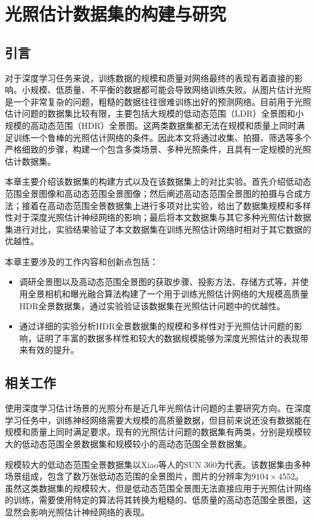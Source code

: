 \chapter{光照估计数据集的构建与研究}\label{chap:dataset}
\section{引言}
对于深度学习任务来说，训练数据的规模和质量对网络最终的表现有着直接的影响。小规模、低质量、不平衡的数据都可能会导致网络训练失败。从图片估计光照是一个非常复杂的问题，粗糙的数据往往很难训练出好的预测网络。目前用于光照估计问题的数据集比较有限，主要包括大规模的低动态范围（LDR）全景图和小规模的高动态范围（HDR）全景图。这两类数据集都无法在规模和质量上同时满足训练一个鲁棒的光照估计网络的条件。因此本文将通过收集、拍摄、筛选等多个严格细致的步骤，构建一个包含多类场景、多种光照条件，且具有一定规模的光照估计数据集。

本章主要介绍该数据集的构建方式以及在该数据集上的对比实验。首先介绍低动态范围全景图像和高动态范围全景图像；然后阐述高动态范围全景图的拍摄与合成方法；接着在高动态范围全景数据集上进行多项对比实验，给出了数据集规模和多样性对于深度光照估计神经网络的影响；最后将本文数据集与其它多种光照估计数据集进行对比，实验结果验证了本文数据集在训练光照估计网络时相对于其它数据的优越性。

本章主要涉及的工作内容和创新点包括：
\begin{itemize}
    \item 调研全景图以及高动态范围全景图的获取步骤、投影方法、存储方式等，并使用全景相机和曝光融合算法构建了一个用于训练光照估计网络的大规模高质量HDR全景数据集，通过实验验证该数据集在光照估计问题中的优越性。
    \item 通过详细的实验分析HDR全景数据集的规模和多样性对于光照估计问题的影响，证明了丰富的数据多样性和较大的数据规模能够为深度光照估计的表现带来有效的提升。
\end{itemize}
\section{相关工作}
使用深度学习估计场景的光照分布是近几年光照估计问题的主要研究方向。在深度学习任务中，训练神经网络需要大规模的高质量数据，但目前来说还没有数据能在规模和质量上同时满足要求。现有的光照估计问题的数据集有两类，分别是规模较大的低动态范围全景数据集和规模较小的高动态范围全景数据集。

规模较大的低动态范围全景数据集以Xiao等人的SUN 360\cite{xiao2012recognizing}为代表。该数据集由多种场景组成，包含了数万张低动态范围的全景图片，图片的分辨率为$9104\times4552$。虽然这类数据集的规模较大，但是低动态范围全景图无法直接应用于光照估计网络的训练，需要使用特定的算法将其转换为粗糙的、低质量的高动态范围全景图，这显然会影响光照估计神经网络的表现。

